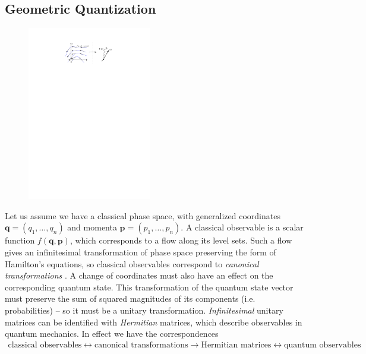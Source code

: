 \documentclass[12pt,final,3p]{elsarticle}
\begin{document}
\subsection{Geometric Quantization}
\begingroup
\setlength{\columnsep}{6pt}
\setlength{\intextsep}{0pt}
\begin{figure}
	\includegraphics[width=0.48\textwidth, keepaspectratio]{figures/quantization.pdf}
	\label{fig:cylinder}
\end{figure}Let us assume we have a classical phase space, with generalized coordinates  $\mathbf{q} = (q_{1},\ldots,q_{n})$ and momenta $\mathbf{p} = (p_{1}, \ldots, p_{n})$. A classical observable is a scalar function $f(\mathbf{q},\mathbf{p})$, which corresponds to a flow along its level sets. Such a flow gives an infinitesimal transformation of phase space preserving the form of Hamilton's equations, so classical observables correspond to \emph{canonical transformations} \cite{hand1998analytical}. A change of coordinates must also have an effect on the corresponding quantum state. This transformation of the quantum state vector must preserve the sum of squared magnitudes of its components (i.e. probabilities) -- so it must be a unitary transformation. \emph{Infinitesimal} unitary matrices can be identified with \emph{Hermitian} matrices, which describe observables in quantum mechanics. In effect we have the correspondences
\begin{align*}
\text{classical observables} \longleftrightarrow \text{canonical transformations}
\longrightarrow \text{Hermitian matrices} \longleftrightarrow \text{quantum observables}
\end{align*} 
\end{document}
